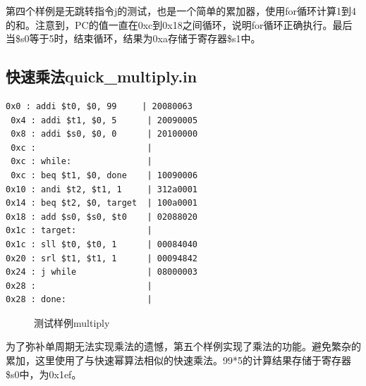 \documentclass[twocolumn]{article} %
\begin{document}
\begin{sloppypar}
第四个样例是无跳转指令j的测试，也是一个简单的累加器，使用for循环计算1到4的和。注意到，PC的值一直在0xc到0x18之间循环，说明for循环正确执行。最后当\$s0等于5时，结束循环，结果为0xa存储于寄存器\$s1中。

\subsection{{\color{red} 快速乘法quick\_multiply.in}}

\begin{lstlisting}[]  
 0x0 : addi $t0, $0, 99     | 20080063
 0x4 : addi $t1, $0, 5      | 20090005
 0x8 : addi $s0, $0, 0      | 20100000
 0xc :                      | 
 0xc : while:               | 
 0xc : beq $t1, $0, done    | 10090006
0x10 : andi $t2, $t1, 1     | 312a0001
0x14 : beq $t2, $0, target  | 100a0001
0x18 : add $s0, $s0, $t0    | 02088020
0x1c : target:              | 
0x1c : sll $t0, $t0, 1      | 00084040
0x20 : srl $t1, $t1, 1      | 00094842
0x24 : j while              | 08000003
0x28 :                      | 
0x28 : done:                | 
\end{lstlisting}  

\begin{figure}[htbp]
\centering
{}


\caption{测试样例multiply}
\end{figure}

为了弥补单周期无法实现乘法的遗憾，第五个样例实现了乘法的功能。避免繁杂的累加，这里使用了与快速幂算法相似的快速乘法。99*5的计算结果存储于寄存器\$s0中，为0x1ef。


\end{sloppypar}
\end{document}
